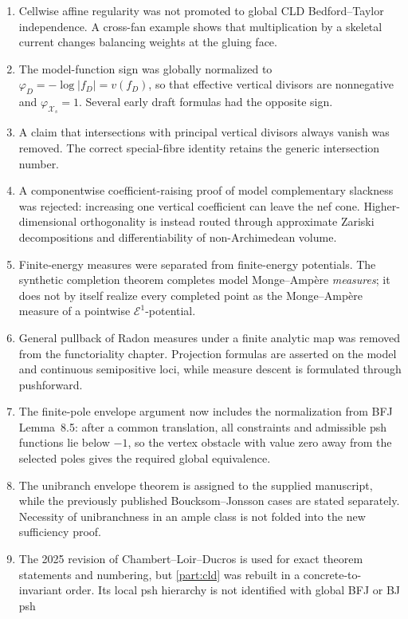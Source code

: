\begin{enumerate}
  novelty claim is made.
\item Cellwise affine regularity was not promoted to global CLD
  Bedford--Taylor independence.  A cross-fan example shows that multiplication
  by a skeletal current changes balancing weights at the gluing face.
\item The model-function sign was globally normalized to
  \(\varphi_D=-\log|f_D|=v(f_D)\), so that effective vertical divisors are
  nonnegative and \(\varphi_{\mathcal X_s}=1\).  Several early draft formulas
  had the opposite sign.
\item A claim that intersections with principal vertical divisors always
  vanish was removed.  The correct special-fibre identity retains the generic
  intersection number.
\item A componentwise coefficient-raising proof of model complementary
  slackness was rejected: increasing one vertical coefficient can leave the
  nef cone.  Higher-dimensional orthogonality is instead routed through
  approximate Zariski decompositions and differentiability of
  non-Archimedean volume.
\item Finite-energy measures were separated from finite-energy potentials.
  The synthetic completion theorem completes model Monge--Ampère
  \emph{measures}; it does not by itself realize every completed point as the
  Monge--Ampère measure of a pointwise \(\mathcal E^1\)-potential.
\item General pullback of Radon measures under a finite analytic map was
  removed from the functoriality chapter.  Projection formulas are asserted
  on the model and continuous semipositive loci, while measure descent is
  formulated through pushforward.
\item The finite-pole envelope argument now includes the normalization from
  BFJ Lemma~8.5: after a common translation, all constraints and admissible
  psh functions lie below \(-1\), so the vertex obstacle with value zero away
  from the selected poles gives the required global equivalence.
\item The unibranch envelope theorem is assigned to the supplied manuscript,
  while the previously published Boucksom--Jonsson cases are stated
  separately.  Necessity of unibranchness in an ample class is not folded
  into the new sufficiency proof.
\item The 2025 revision of Chambert--Loir--Ducros is used for exact theorem
  statements and numbering, but \cref{part:cld} was rebuilt in a concrete-to-invariant
  order.  Its local psh hierarchy is not identified with global BFJ or BJ psh

\end{enumerate}
